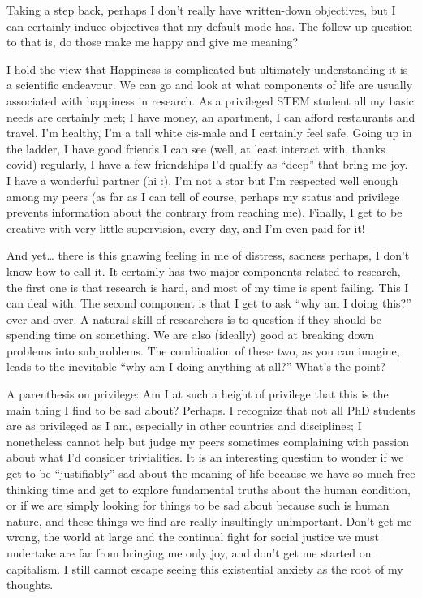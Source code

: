 Taking a step back, perhaps I don’t really have written-down objectives, but I can certainly induce objectives that my default mode has. The follow up question to that is, do those make me happy and give me meaning?

I hold the view that Happiness is complicated but ultimately understanding it is a scientific endeavour. We can go and look at what components of life are usually associated with happiness in research. As a privileged STEM student all my basic needs are certainly met; I have money, an apartment, I can afford restaurants and travel. I’m healthy, I’m a tall white cis-male and I certainly feel safe. Going up in the ladder, I have good friends I can see (well, at least interact with, thanks covid) regularly, I have a few friendships I’d qualify as “deep” that bring me joy. I have a wonderful partner (hi :). I’m not a star but I’m respected well enough among my peers (as far as I can tell of course, perhaps my status and privilege prevents information about the contrary from reaching me). Finally, I get to be creative with very little supervision, every day, and I’m even paid for it! 

And yet… there is this gnawing feeling in me of distress, sadness perhaps, I don’t know how to call it. It certainly has two major components related to research, the first one is that research is hard, and most of my time is spent failing. This I can deal with. The second component is that I get to ask “why am I doing this?” over and over. A natural skill of researchers is to question if they should be spending time on something. We are also (ideally) good at breaking down problems into subproblems. The combination of these two, as you can imagine, leads to the inevitable “why am I doing anything at all?” What’s the point?

A parenthesis on privilege: Am I at such a height of privilege that this is the main thing I find to be sad about? Perhaps. I recognize that not all PhD students are as privileged as I am, especially in other countries and disciplines; I nonetheless cannot help but judge my peers sometimes complaining with passion about what I’d consider trivialities. It is an interesting question to wonder if we get to be “justifiably” sad about the meaning of life because we have so much free thinking time and get to explore fundamental truths about the human condition, or if we are simply looking for things to be sad about because such is human nature, and these things we find are really insultingly unimportant. Don’t get me wrong, the world at large and the continual fight for social justice we must undertake are far from bringing me only joy, and don’t get me started on capitalism. I still cannot escape seeing this existential anxiety as the root of my thoughts.

